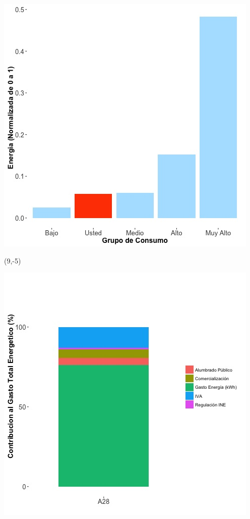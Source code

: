 \documentclass{article}\usepackage[]{graphicx}\usepackage[]{color}
\newenvironment{knitrout}{}{} %
\begin{document}
\begin{knitrout}
\color{fgcolor}
\includegraphics[scale=0.65]{figure/A28_neighbor_plot} 
\end{knitrout}

 \begin{textblock}{1}(9,-5)
\begin{minipage}{20em}
\begingroup

\endgroup
\end{minipage}
\end{textblock}

\begin{knitrout}
\color{fgcolor}
\includegraphics[scale=0.65]{figure/A28_costvars_plot.jpg} 
\end{knitrout}
\end{document}
